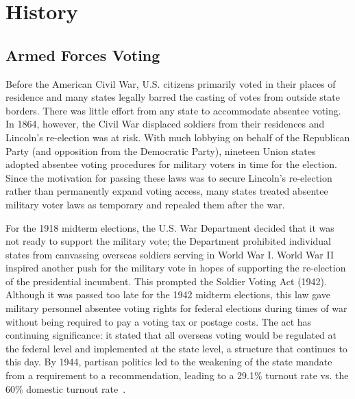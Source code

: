 

\section{History}

\subsection{Armed Forces Voting}
Before the American Civil War, U.S. citizens primarily voted in their
places of residence and many states legally barred the casting of
votes from outside state borders. There was little effort from any
state to accommodate absentee voting. In 1864, however, the Civil War
displaced soldiers from their residences and Lincoln's re-election was
at risk. With much lobbying on behalf of the Republican Party (and
opposition from the Democratic Party), nineteen Union states adopted
absentee voting procedures for military voters in time for the
election. Since the motivation for passing these laws was to secure
Lincoln's re-election rather than permanently expand voting access,
many states treated absentee military voter laws as temporary and
repealed them after the war.

For the 1918 midterm elections, the U.S. War Department decided that
it was not ready to support the military vote; the Department
prohibited individual states from canvassing overseas soldiers serving
in World War I. World War II inspired another push for the military
vote in hopes of supporting the re-election of the presidential
incumbent. This prompted the Soldier Voting Act (1942).  Although it
was passed too late for the 1942 midterm elections, this law gave
military personnel absentee voting rights for federal elections during
times of war without being required to pay a voting tax or postage
costs. The act has continuing significance: it stated that all
overseas voting would be regulated at the federal level and
implemented at the state level, a structure that continues to this
day. By 1944, partisan politics led to the weakening of the state
mandate from a requirement to a recommendation, leading to a 29.1\%
turnout rate vs. the 60\% domestic turnout rate~\cite{smith2015}.

